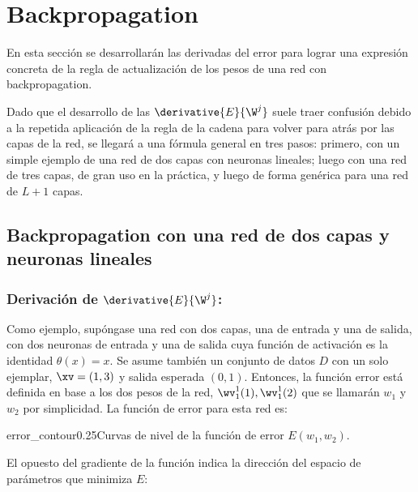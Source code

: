 \section{Backpropagation}

En esta sección se desarrollarán las derivadas del error para lograr una expresión concreta de la regla de actualización de los pesos de una red con backpropagation.

Dado que el desarrollo de las $\derivative{E}{\W^j}$ suele traer confusión debido a la repetida aplicación de la regla de la cadena para volver para atrás por las capas de la red, se llegará a una fórmula general en tres pasos: primero, con un simple ejemplo de una red de dos capas con neuronas lineales; luego con una red de tres capas, de gran uso en la práctica, y luego de forma genérica para una red de $L+1$ capas.

\subsection{Backpropagation con una red de dos capas y neuronas lineales} 


\subsubsection{Derivación de $\derivative{E}{\W^j}$:}
Como ejemplo, supóngase una red con dos capas, una de entrada y una de salida, con dos neuronas de entrada y una de salida cuya función de activación es la identidad $\theta(x)=x$. Se asume también un conjunto de datos $D$ con un solo ejemplar, $\xv=(1,3)$ y salida esperada $(0,1)$. Entonces, la función error está definida en base a los dos pesos de la red, $\wv_1^1(1),\wv_1^1(2)$ que se llamarán $w_1$ y $w_2$ por simplicidad. La función de error para esta red es:



{error_contour}{0.25}{Curvas de nivel de la función de error $E(w_1,w_2)$.}


El opuesto del gradiente de la función indica la dirección del espacio de parámetros que minimiza $E$:


